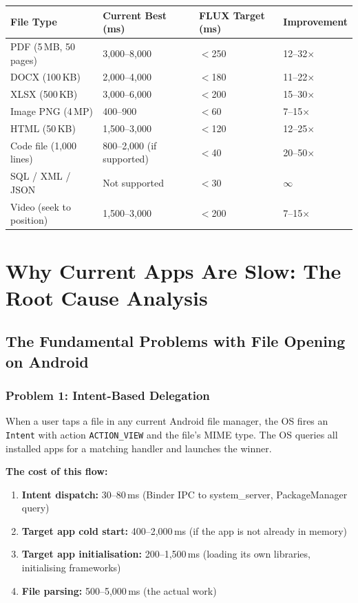 \documentclass[11pt, a4paper, openright]{report}
\begin{document}
\begin{insightbox}[title={Target Performance Across All File Types}]
\begin{tabular}{@{}llll@{}}
\toprule
\textbf{File Type} & \textbf{Current Best (ms)} & \textbf{FLUX Target (ms)} & \textbf{Improvement} \\
\midrule
PDF (5\,MB, 50 pages) & 3,000--8,000 & $<$250 & 12--32$\times$ \\
DOCX (100\,KB) & 2,000--4,000 & $<$180 & 11--22$\times$ \\
XLSX (500\,KB) & 3,000--6,000 & $<$200 & 15--30$\times$ \\
Image PNG (4\,MP) & 400--900 & $<$60 & 7--15$\times$ \\
HTML (50\,KB) & 1,500--3,000 & $<$120 & 12--25$\times$ \\
Code file (1,000 lines) & 800--2,000 (if supported) & $<$40 & 20--50$\times$ \\
SQL / XML / JSON & Not supported & $<$30 & $\infty$ \\
Video (seek to position) & 1,500--3,000 & $<$200 & 7--15$\times$ \\
\bottomrule
\end{tabular}
\end{insightbox}

\newpage
\tableofcontents
\newpage

\part{Why Current Apps Are Slow: The Root Cause Analysis}

\chapter{The Fundamental Problems with File Opening on Android}

\section{Problem 1: Intent-Based Delegation}

When a user taps a file in any current Android file manager, the OS fires an \texttt{Intent} with action \texttt{ACTION\_VIEW} and the file's MIME type. The OS queries all installed apps for a matching handler and launches the winner.

\textbf{The cost of this flow:}
\begin{enumerate}
  \item \textbf{Intent dispatch:} 30--80\,ms (Binder IPC to system\_server, PackageManager query)
  \item \textbf{Target app cold start:} 400--2,000\,ms (if the app is not already in memory)
  \item \textbf{Target app initialisation:} 200--1,500\,ms (loading its own libraries, initialising frameworks)
  \item \textbf{File parsing:} 500--5,000\,ms (the actual work)
\end{enumerate}
\end{document}
